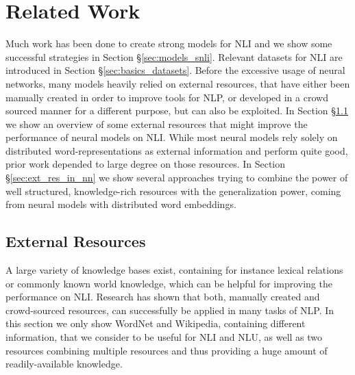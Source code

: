\section{Related Work}\label{sec:related_work}
Much work has been done to create strong models for \ac{NLI} and we show some successful strategies in Section §\ref{sec:models_snli}. Relevant datasets for \ac{NLI} are introduced in Section §\ref{sec:basics_datasets}. Before the excessive usage of neural networks, many models heavily relied on external resources, that have either been manually created in order to improve tools for \ac{NLP}, or developed in a crowd sourced manner for a different purpose, but can also be exploited. In Section §\ref{sec:ext_resources} we show an overview of some external resources that might improve the performance of neural models on \ac{NLI}. While most neural models rely solely on distributed word-representations as external information and perform quite good, prior work \citep{bos2005recognising,tatu2005semantic} depended to large degree on those resources. In Section §\ref{sec:ext_res_in_nn} we show several approaches trying to combine the power of well structured, knowledge-rich resources with the generalization power, coming from neural models with distributed word embeddings.
\subsection{External Resources}\label{sec:ext_resources}
A large variety of knowledge bases exist, containing for instance lexical relations or commonly known world knowledge, which can be helpful for improving the performance on \ac{NLI}. Research has shown that both, manually created and crowd-sourced resources, can successfully be applied in many tasks of \ac{NLP}. In this section we only show WordNet and Wikipedia, containing different information, that we consider to be useful for \ac{NLI} and \ac{NLU}, as well as two resources combining multiple resources and thus providing a huge amount of readily-available knowledge.

